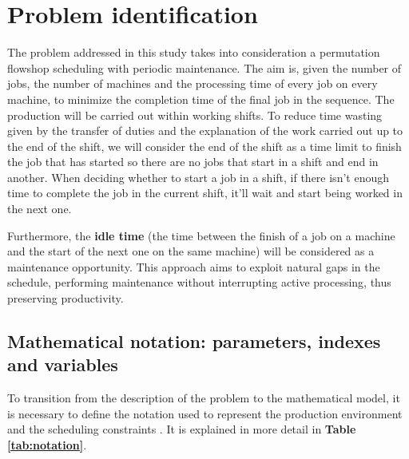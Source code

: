 \chapter{Problem identification}
\label{sec:intro_prob_id}

The problem addressed in this study takes into consideration a permutation flowshop scheduling with periodic maintenance. The aim is, given the number of jobs, the number of machines and the processing time of every job on every machine, to minimize the completion time of the final job in the sequence. The production will be carried out within working shifts. To reduce time wasting given by the transfer of duties and the explanation of the work carried out up to the end of the shift, we will consider the end of the shift as a time limit to finish the job that has started so there are no jobs that start in a shift and end in another. When deciding whether to start a job in a shift, if there isn't enough time to complete the job in the current shift, it'll wait and start being worked in the next one.

Furthermore, the \textbf{idle time} (the time between the finish of a job on a machine and the start of the next one on the same machine) will be considered as a maintenance opportunity. This approach aims to exploit natural gaps in the schedule, performing maintenance without interrupting active processing, thus preserving productivity.

\section[Mathematical notation: parameters, indexes and variables]{Mathematical notation: parameters, indexes and variables}

To transition from the description of the problem to the mathematical model, it is necessary to define the notation used to represent the production environment and the scheduling constraints \cite{perez2020permutation}. It is explained in more detail in \textbf{Table \ref{tab:notation}}.


